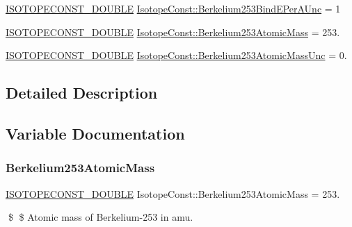 \begin{DoxyCompactItemize}
\mbox{\hyperlink{group___isotope_const-_macros_ga8f45a7272ce02c0b4c65c44636ed719a}{I\+S\+O\+T\+O\+P\+E\+C\+O\+N\+S\+T\+\_\+\+D\+O\+U\+B\+LE}} \mbox{\hyperlink{group___isotope_const-_berkelium-_bk253_gac0ac39e43d5a283d68550cb4812d9b97}{Isotope\+Const\+::\+Berkelium253\+Bind\+E\+Per\+A\+Unc}} = 1
\item 
\mbox{\hyperlink{group___isotope_const-_macros_ga8f45a7272ce02c0b4c65c44636ed719a}{I\+S\+O\+T\+O\+P\+E\+C\+O\+N\+S\+T\+\_\+\+D\+O\+U\+B\+LE}} \mbox{\hyperlink{group___isotope_const-_berkelium-_bk253_ga54a0224e670d4e34bd11904bf656e13a}{Isotope\+Const\+::\+Berkelium253\+Atomic\+Mass}} = 253.
\item 
\mbox{\hyperlink{group___isotope_const-_macros_ga8f45a7272ce02c0b4c65c44636ed719a}{I\+S\+O\+T\+O\+P\+E\+C\+O\+N\+S\+T\+\_\+\+D\+O\+U\+B\+LE}} \mbox{\hyperlink{group___isotope_const-_berkelium-_bk253_ga649a7c642a68cee7e266046675a13aa5}{Isotope\+Const\+::\+Berkelium253\+Atomic\+Mass\+Unc}} = 0.
\end{DoxyCompactItemize}


\subsection{Detailed Description}


\subsection{Variable Documentation}
\mbox{\label{group___isotope_const-_berkelium-_bk253_ga54a0224e670d4e34bd11904bf656e13a}} 
\subsubsection{\texorpdfstring{Berkelium253\+Atomic\+Mass}{Berkelium253AtomicMass}}
{\footnotesize\ttfamily \mbox{\hyperlink{group___isotope_const-_macros_ga8f45a7272ce02c0b4c65c44636ed719a}{I\+S\+O\+T\+O\+P\+E\+C\+O\+N\+S\+T\+\_\+\+D\+O\+U\+B\+LE}} Isotope\+Const\+::\+Berkelium253\+Atomic\+Mass = 253.}

\$ \$ Atomic mass of Berkelium-\/253 in amu. \mbox{\label{group___isotope_const-_berkelium-_bk253_ga649a7c642a68cee7e266046675a13aa5}} 
